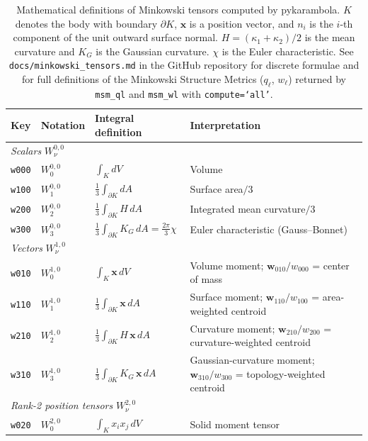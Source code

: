 \documentclass[times, twoside, watermark]{zHenriquesLab-StyleBioRxiv}
\newcommand{\newtxt}[1]{#1}
\newcommand{\added}[2][]{#2}        %
\newcommand{\newtxt}[1]{\textcolor{chgadded}{#1}}
\renewcommand{\added}[2][]{\newtxt{#2}}  %
\begin{document}
\added{%
\begin{table}[!ht]
\centering
\caption{%
  \added{Mathematical definitions of Minkowski tensors computed by pykarambola.
  $K$ denotes the body with boundary $\partial K$, $\mathbf{x}$ is a position vector, and $n_i$ is the $i$-th component of the unit outward surface normal.
  $H=(\kappa_1{+}\kappa_2)/2$ is the mean curvature and $K_G$ is the Gaussian curvature.
  $\chi$ is the Euler characteristic.
  See \texttt{docs/minkowski\_tensors.md} in the GitHub repository for discrete formulae and for full definitions of the Minkowski Structure Metrics ($q_\ell$, $w_\ell$) returned by \texttt{msm\_ql} and \texttt{msm\_wl} with \texttt{compute=`all'}.}
}
\label{tab:tensors}
\small
\renewcommand{\arraystretch}{1.7}
\begin{tabular}{llll}
\hline
\textbf{Key} & \textbf{Notation} & \textbf{Integral definition} & \textbf{Interpretation} \\
\hline
\multicolumn{4}{l}{\textit{Scalars} $W_\nu^{0,0}$} \\
\texttt{w000} & $W_0^{0,0}$ & $\int_K dV$ & Volume \\
\texttt{w100} & $W_1^{0,0}$ & $\tfrac{1}{3}\int_{\partial K} dA$ & Surface area$/3$ \\
\texttt{w200} & $W_2^{0,0}$ & $\tfrac{1}{3}\int_{\partial K} H\,dA$ & Integrated mean curvature$/3$ \\
\texttt{w300} & $W_3^{0,0}$ & $\tfrac{1}{3}\int_{\partial K} K_G\,dA = \tfrac{2\pi}{3}\chi$ & Euler characteristic (Gauss--Bonnet) \\
\hline
\multicolumn{4}{l}{\textit{Vectors} $W_\nu^{1,0}$} \\
\texttt{w010} & $W_0^{1,0}$ & $\int_K \mathbf{x}\,dV$ & Volume moment; $\mathbf{w}_{010}/w_{000}$ = center of mass \\
\texttt{w110} & $W_1^{1,0}$ & $\tfrac{1}{3}\int_{\partial K} \mathbf{x}\,dA$ & Surface moment; $\mathbf{w}_{110}/w_{100}$ = area-weighted centroid \\
\texttt{w210} & $W_2^{1,0}$ & $\tfrac{1}{3}\int_{\partial K} H\,\mathbf{x}\,dA$ & Curvature moment; $\mathbf{w}_{210}/w_{200}$ = curvature-weighted centroid \\
\texttt{w310} & $W_3^{1,0}$ & $\tfrac{1}{3}\int_{\partial K} K_G\,\mathbf{x}\,dA$ & Gaussian-curvature moment; $\mathbf{w}_{310}/w_{300}$ = topology-weighted centroid \\
\hline
\multicolumn{4}{l}{\textit{Rank-2 position tensors} $W_\nu^{2,0}$} \\
\texttt{w020} & $W_0^{2,0}$ & $\int_K x_i x_j\,dV$ & Solid moment tensor \\

\end{tabular}
\end{table}}
\end{document}
